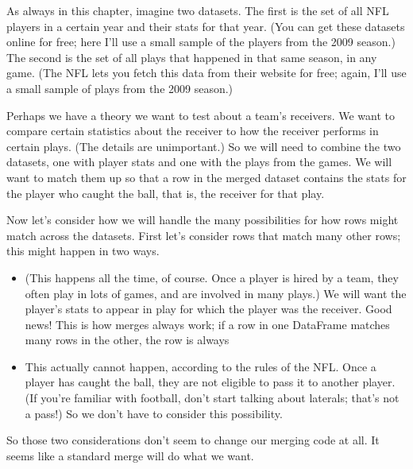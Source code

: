 \documentclass[letterpaper,10pt,english]{sphinxmanual}
\begin{document}
As always in this chapter, imagine two datasets.  The first is the set of all NFL players in a certain year and their stats for that year.  (You can get these datasets online for free; here I’ll use a small sample of the players from the 2009 season.)  The second is the set of all plays that happened in that same season, in any game.  (The NFL lets you fetch this data from their website for free; again, I’ll use a small sample of plays from the 2009 season.)

Perhaps we have a theory we want to test about a team’s receivers.  We want to compare certain statistics about the receiver to how the receiver performs in certain plays.  (The details are unimportant.)  So we will need to combine the two datasets, one with player stats and one with the plays from the games.  We will want to match them up so that a row in the merged dataset contains the stats for the player who caught the ball, that is, the receiver for that play.

Now let’s consider how we will handle the many possibilities for how rows might match across the datasets.  First let’s consider rows that match many other rows; this might happen in two ways.
\begin{itemize}
\item {} 
  (This happens all the time, of course.  Once a player is hired by a team, they often play in lots of games, and are involved in many plays.)  We will want the player’s stats to appear in  play for which the player was the receiver.  Good news!  This is how merges always work; if a row in one DataFrame matches many rows in the other, the row is always 

\item {} 
  This actually cannot happen, according to the rules of the NFL.  Once a player has caught the ball, they are not eligible to pass it to another player.  (If you’re familiar with football, don’t start talking about laterals; that’s not a pass!)  So we don’t have to consider this possibility.

\end{itemize}

So those two considerations don’t seem to change our merging code at all.  It seems like a standard merge will do what we want.
\end{document}
